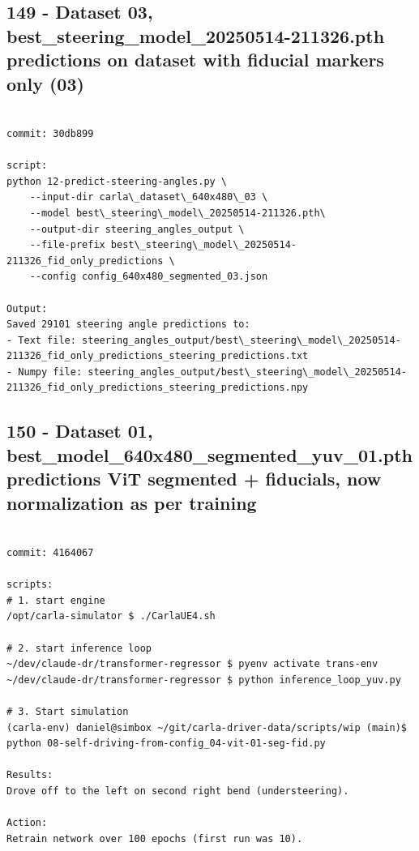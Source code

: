 \subsection{149 - Dataset 03, best\_steering\_model\_20250514-211326.pth predictions on dataset with fiducial markers only (03)}
\label{app_res:149}

\begin{verbatim}

commit: 30db899

script:
python 12-predict-steering-angles.py \
    --input-dir carla\_dataset\_640x480\_03 \
    --model best\_steering\_model\_20250514-211326.pth\
    --output-dir steering_angles_output \
    --file-prefix best\_steering\_model\_20250514-211326_fid_only_predictions \
    --config config_640x480_segmented_03.json

Output:
Saved 29101 steering angle predictions to:
- Text file: steering_angles_output/best\_steering\_model\_20250514-211326_fid_only_predictions_steering_predictions.txt
- Numpy file: steering_angles_output/best\_steering\_model\_20250514-211326_fid_only_predictions_steering_predictions.npy

\end{verbatim}

\subsection{150 - Dataset 01, best\_model\_640x480\_segmented\_yuv\_01.pth predictions ViT segmented + fiducials, now normalization as per training}
\label{app_res:150}

\begin{verbatim}

commit: 4164067

scripts:
# 1. start engine
/opt/carla-simulator $ ./CarlaUE4.sh

# 2. start inference loop
~/dev/claude-dr/transformer-regressor $ pyenv activate trans-env
~/dev/claude-dr/transformer-regressor $ python inference_loop_yuv.py

# 3. Start simulation
(carla-env) daniel@simbox ~/git/carla-driver-data/scripts/wip (main)$ python 08-self-driving-from-config_04-vit-01-seg-fid.py 

Results:
Drove off to the left on second right bend (understeering).

Action:
Retrain network over 100 epochs (first run was 10).

\end{verbatim}


